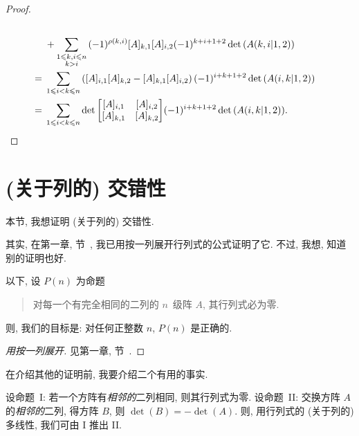 \begin{proof}
\begin{align*}
        \\
             &
        +
        \sum_{\substack{1 \leq k,i \leq n     \\k > i}}
        {(-1)^{\rho(k,i)}
                [A]_{k,1} [A]_{i,2}
            (-1)^{k+i+1+2}
            \det {(A(k,i|1,2))}}
        \\
        = {} &
        \sum_{1 \leq i < k \leq n}
        {([A]_{i,1} [A]_{k,2} - [A]_{k,1} [A]_{i,2})\,
        (-1)^{i+k+1+2}
        \det {(A(i,k|1,2))}}
        \\
        = {} &
        \sum_{1 \leq i < k \leq n}
        {\det {
                \begin{bmatrix}
                    [A]_{i,1} & [A]_{i,2} \\
                    [A]_{k,1} & [A]_{k,2} \\
                \end{bmatrix}
            }
            (-1)^{i+k+1+2}
            \det {(A(i,k|1,2))}}.
        \qedhere
    \end{align*}
\end{proof}

\section{(关于列的) 交错性}

本节, 我想证明 (关于列的) 交错性.

其实, 在第一章, 节~,
我已用按一列展开行列式的公式证明了它.
不过, 我想, 知道别的证明也好.



以下, 设 \(P(n)\) 为命题
\begin{quotation}
    对每一个有完全相同的二列的 \(n\)~级阵 \(A\),
    其行列式必为零.
\end{quotation}
则, 我们的目标是:
对任何正整数 \(n\), \(P(n)\) 是正确的.

\begin{proof}[用按一列展开]
    见第一章, 节~.
\end{proof}

在介绍其他的证明前, 我要介绍二个有用的事实.

\begin{theorem}
    设命题~I:
    若一个方阵有\emph{相邻的}二列相同, 则其行列式为零.
    设命题~II:
    交换方阵 \(A\) 的\emph{相邻的}二列, 得方阵 \(B\),
    则 \(\det {(B)} = -\det {(A)}\).
    则, 用行列式的 (关于列的) 多线性,
    我们可由 I 推出 II.
\end{theorem}

